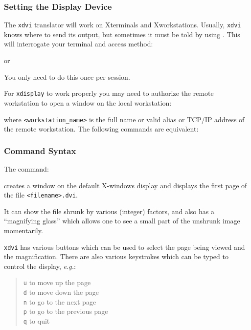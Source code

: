 \documentclass[11pt,twoside,nolof]{starlink}
\begin{document}
\subsubsection{Setting the Display Device}

The \verb+xdvi+ translator will work on Xterminals and Xworkstations.
Usually, \verb+xdvi+ knows where to send its output, but sometimes it must
be told by using \cite{sun129}.
This will interrogate your terminal and access method:
\begin{terminalv}
\end{terminalv}
or
\begin{terminalv}
\end{terminalv}
You only need to do this once per session.

For \texttt{xdisplay} to work properly you may need to authorize the remote
workstation to open a window on the local workstation:
\begin{terminalv}
\end{terminalv}
where \verb+<workstation_name>+ is the full name or valid alias or TCP/IP
address of the remote workstation. The following commands are equivalent:
\begin{terminalv}
\end{terminalv}

\subsubsection{Command Syntax}
The command:
\begin{terminalv}
\end{terminalv}
creates a window on the default X-windows display and displays the first
page of the file \texttt{<filename>.dvi}.

It can show the file shrunk by various
(integer) factors, and also has a ``magnifying glass'' which allows one
to see a small part of the unshrunk image momentarily.

\texttt{xdvi} has various buttons which can be used to select the page
being viewed and the magnification. There are also various
keystrokes which can be typed to control the display, \emph{e.g.}:
\begin{quote}
  \texttt{u} to move up the page \\
  \texttt{d} to move down the page \\
  \texttt{n} to go to the next page \\
  \texttt{p} to go to the previous page \\
  \texttt{q} to quit
\end{quote}
\end{document}
